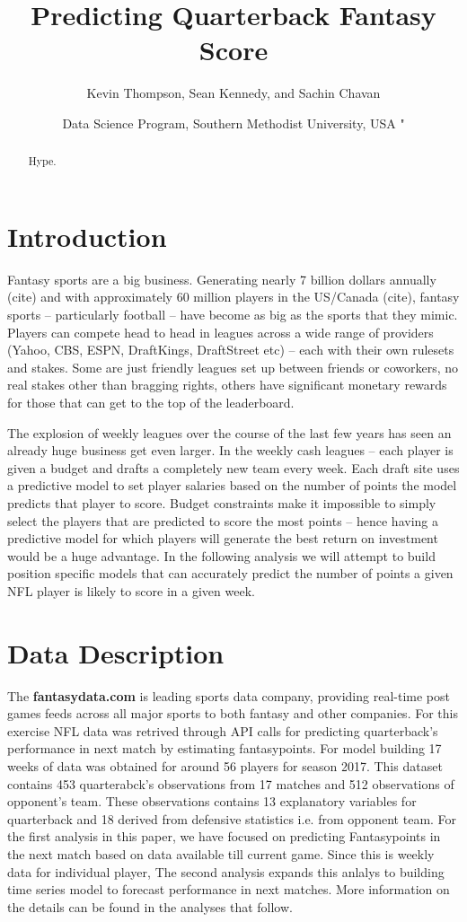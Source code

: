 \documentclass[american,]{article}
\title{Predicting Quarterback Fantasy Score}
\author{Kevin Thompson, Sean Kennedy, and Sachin Chavan}
\date{Data Science Program, Southern Methodist University, USA \break"}
\begin{document}
\maketitle
\begin{abstract}
Hype.
\end{abstract}

\section{Introduction}\label{introduction}

Fantasy sports are a big business. Generating nearly 7 billion dollars
annually (cite) and with approximately 60 million players in the
US/Canada (cite), fantasy sports -- particularly football -- have become
as big as the sports that they mimic. Players can compete head to head
in leagues across a wide range of providers (Yahoo, CBS, ESPN,
DraftKings, DraftStreet etc) -- each with their own rulesets and stakes.
Some are just friendly leagues set up between friends or coworkers, no
real stakes other than bragging rights, others have significant monetary
rewards for those that can get to the top of the leaderboard.

The explosion of weekly leagues over the course of the last few years
has seen an already huge business get even larger. In the weekly cash
leagues -- each player is given a budget and drafts a completely new
team every week. Each draft site uses a predictive model to set player
salaries based on the number of points the model predicts that player to
score. Budget constraints make it impossible to simply select the
players that are predicted to score the most points -- hence having a
predictive model for which players will generate the best return on
investment would be a huge advantage. In the following analysis we will
attempt to build position specific models that can accurately predict
the number of points a given NFL player is likely to score in a given
week.

\section{Data Description}\label{data-description}

The \textbf{fantasydata.com} is leading sports data company, providing real-time post games feeds across all major sports to both fantasy and other companies. For this exercise NFL data was retrived through API calls for predicting quarterback's performance in next match by estimating fantasypoints. For model building 17 weeks of data was obtained for around 56 players for season 2017. This dataset contains 453 quarterabck's observations from 17 matches and 512 observations of opponent's team. These observations contains 13 explanatory variables for quarterback and 18 derived from defensive statistics i.e. from opponent team. For the first analysis in this paper, we have focused on predicting Fantasypoints in the next match based on data available till current game. Since this is weekly data for individual player, The second analysis expands this anlalys to building time series model to forecast performance in next matches. More information on the details can be found in the analyses that follow. 
\end{document}
